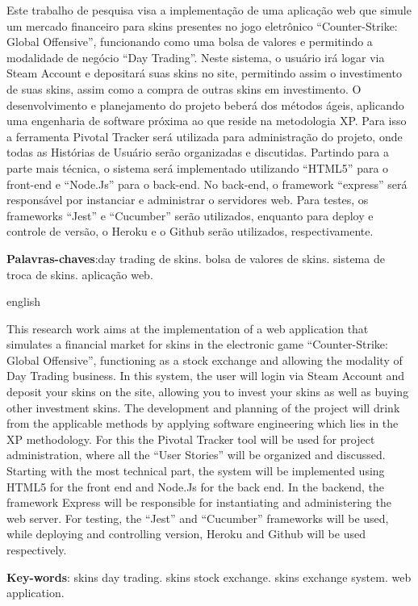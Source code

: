 
\setlength{\absparsep}{18pt} %
\begin{resumo}
Este trabalho de pesquisa visa a implementação de uma aplicação web que simule um
mercado financeiro para skins presentes no jogo eletrônico ``Counter-Strike: Global
Offensive'', funcionando como uma bolsa de valores e permitindo a modalidade de
negócio ``Day Trading''. Neste sistema, o usuário irá logar via Steam Account e
depositará suas skins no site, permitindo assim o investimento de suas skins, assim como
a compra de outras skins em investimento. O desenvolvimento e planejamento do
projeto beberá dos métodos ágeis, aplicando uma engenharia de software próxima ao
que reside na metodologia XP. Para isso a ferramenta Pivotal Tracker será utilizada
para administração do projeto, onde todas as Histórias de Usuário serão organizadas e
discutidas. Partindo para a parte mais técnica, o sistema será implementado utilizando
``HTML5'' para o front-end e ``Node.Js'' para o back-end. No back-end, o framework
``express'' será responsável por instanciar e administrar o servidores web. Para testes, os
frameworks ``Jest'' e ``Cucumber'' serão utilizados, enquanto para deploy e controle de
versão, o Heroku e o Github serão utilizados, respectivamente.


 \textbf{Palavras-chaves}:day trading de skins. bolsa de valores de skins. sistema de troca de
skins. aplicação web.
\end{resumo}

\begin{resumo}[Abstract]
 \begin{otherlanguage*}{english}
   \vspace{\onelineskip}

This research work aims at the implementation of a web application that simulates a
financial market for skins in the electronic game ``Counter-Strike: Global
Offensive'', functioning as a stock exchange and allowing the modality of
Day Trading business. In this system, the user will login via Steam Account and
deposit your skins on the site, allowing you to invest your skins as well as
buying other investment skins. The development and planning of the
project will drink from the applicable methods by applying software engineering
which lies in the XP methodology. For this the Pivotal Tracker tool will be used
for project administration, where all the ``User Stories'' will be organized and
discussed. Starting with the most technical part, the system will be implemented using
HTML5 for the front end and Node.Js for the back end. In the backend, the framework
Express will be responsible for instantiating and administering the web server. For testing, the
``Jest'' and ``Cucumber'' frameworks will be used, while deploying and controlling
version, Heroku and Github will be used respectively.

 
   \noindent 
   \textbf{Key-words}: skins day trading. skins stock exchange. skins exchange system. web application.
 \end{otherlanguage*}
\end{resumo}